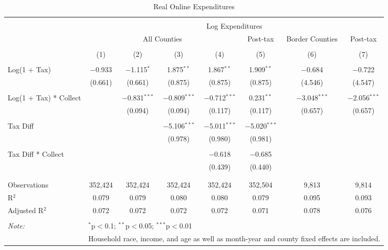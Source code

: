 
\begin{table}[!htbp] \centering 
  \caption{Real Online Expenditures} 
  \label{} 
\begin{tabular}{@{\extracolsep{5pt}}lccccccc} 
\\[-1.8ex]\hline 
\hline \\[-1.8ex] 
 & \multicolumn{7}{c}{Log Expenditures} \\ 
\cline{2-8} 
 & \multicolumn{4}{c}{All Counties} & Post-tax & Border Counties & Post-tax \\ 
\\[-1.8ex] & (1) & (2) & (3) & (4) & (5) & (6) & (7)\\ 
\hline \\[-1.8ex] 
 Log(1 + Tax) & $-$0.933 & $-$1.115$^{*}$ & 1.875$^{**}$ & 1.867$^{**}$ & 1.909$^{**}$ & $-$0.684 & $-$0.722 \\ 
  & (0.661) & (0.661) & (0.875) & (0.875) & (0.875) & (4.546) & (4.547) \\ 
  & & & & & & & \\ 
 Log(1 + Tax) * Collect &  & $-$0.831$^{***}$ & $-$0.809$^{***}$ & $-$0.712$^{***}$ & 0.231$^{**}$ & $-$3.048$^{***}$ & $-$2.056$^{***}$ \\ 
  &  & (0.094) & (0.094) & (0.117) & (0.117) & (0.657) & (0.657) \\ 
  & & & & & & & \\ 
 Tax Diff &  &  & $-$5.106$^{***}$ & $-$5.011$^{***}$ & $-$5.020$^{***}$ &  &  \\ 
  &  &  & (0.978) & (0.980) & (0.981) &  &  \\ 
  & & & & & & & \\ 
 Tax Diff * Collect &  &  &  & $-$0.618 & $-$0.685 &  &  \\ 
  &  &  &  & (0.439) & (0.440) &  &  \\ 
  & & & & & & & \\ 
\hline \\[-1.8ex] 
Observations & 352,424 & 352,424 & 352,424 & 352,424 & 352,504 & 9,813 & 9,814 \\ 
R$^{2}$ & 0.079 & 0.079 & 0.080 & 0.080 & 0.079 & 0.095 & 0.093 \\ 
Adjusted R$^{2}$ & 0.072 & 0.072 & 0.072 & 0.072 & 0.071 & 0.078 & 0.076 \\ 
\hline 
\hline \\[-1.8ex] 
\textit{Note:}  & \multicolumn{7}{l}{$^{*}$p$<$0.1; $^{**}$p$<$0.05; $^{***}$p$<$0.01} \\ 
 & \multicolumn{7}{l}{Household race, income, and age as well as month-year and county fixed effects are included.} \\ 
\end{tabular} 
\end{table} 
